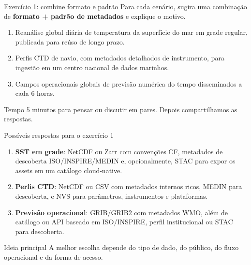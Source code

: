 \documentclass[aspectratio=169]{beamer}
\begin{document}
\begin{frame}{Exercício 1: combine formato e padrão}
Para cada cenário, sugira uma combinação de \textbf{formato + padrão de metadados} e explique o motivo.

\vspace{0.3cm}

\begin{enumerate}
  \item Reanálise global diária de temperatura da superfície do mar em grade regular, publicada para reúso de longo prazo.
  \item Perfis CTD de navio, com metadados detalhados de instrumento, para ingestão em um centro nacional de dados marinhos.
  \item Campos operacionais globais de previsão numérica do tempo disseminados a cada 6 horas.
\end{enumerate}

\vspace{0.4cm}

\begin{block}{Tempo}
5 minutos para pensar ou discutir em pares. Depois compartilhamos as respostas.
\end{block}
\end{frame}

\begin{frame}{Possíveis respostas para o exercício 1}
\small
\begin{enumerate}
  \item \textbf{SST em grade}: NetCDF ou Zarr com convenções CF, metadados de descoberta ISO/INSPIRE/MEDIN e, opcionalmente, STAC para expor os assets em um catálogo cloud-native.
  \item \textbf{Perfis CTD}: NetCDF ou CSV com metadados internos ricos, MEDIN para descoberta, e NVS para parâmetros, instrumentos e plataformas.
  \item \textbf{Previsão operacional}: GRIB/GRIB2 com metadados WMO, além de catálogo ou API baseado em ISO/INSPIRE, perfil institucional ou STAC para descoberta.
\end{enumerate}

\vspace{0.3cm}

\begin{block}{Ideia principal}
A melhor escolha depende do tipo de dado, do público, do fluxo operacional e da forma de acesso.
\end{block}
\end{frame}
\end{document}
